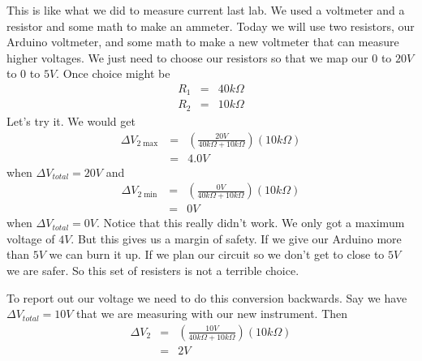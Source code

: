 This is like what we did to measure current last lab. We used a voltmeter
and a resistor and some math to make an ammeter. Today we will use two
resistors, our Arduino voltmeter, and some math to make a new voltmeter that
can measure higher voltages. We just need to choose our resistors so that we
map our $0$ to $20\unit{V}$ to $0$ to $5\unit{V}.$ Once choice might be 
\begin{eqnarray*}
R_{1} &=&40\unit{k%
\Omega%
} \\
R_{2} &=&10\unit{k%
\Omega%
}
\end{eqnarray*}%
Let's try it. We would get%
\begin{eqnarray*}
\Delta V_{2\max } &=&\left( \frac{20\unit{V}}{40\unit{k%
\Omega%
}+10\unit{k%
\Omega%
}}\right) \left( 10\unit{k%
\Omega%
}\right) \\
&=&4.0\unit{V}
\end{eqnarray*}%
when $\Delta V_{total}=20\unit{V}$ and 
\begin{eqnarray*}
\Delta V_{2\min } &=&\left( \frac{0\unit{V}}{40\unit{k%
\Omega%
}+10\unit{k%
\Omega%
}}\right) \left( 10\unit{k%
\Omega%
}\right) \\
&=&0\unit{V}
\end{eqnarray*}%
when $\Delta V_{total}=0\unit{V}.$ Notice that this really didn't work. We
only got a maximum voltage of $4\unit{V}.$ But this gives us a margin of
safety. If we give our Arduino more than $5\unit{V}$ we can burn it up. If
we plan our circuit so we don't get to close to $5\unit{V}$ we are safer. So
this set of resisters is not a terrible choice.

To report out our voltage we need to do this conversion backwards. Say we
have $\Delta V_{total}=10\unit{V}$ that we are measuring with our new
instrument. Then 
\begin{eqnarray*}
\Delta V_{2} &=&\left( \frac{10\unit{V}}{40\unit{k%
\Omega%
}+10\unit{k%
\Omega%
}}\right) \left( 10\unit{k%
\Omega%
}\right) \\
&=&2\unit{V}
\end{eqnarray*}

